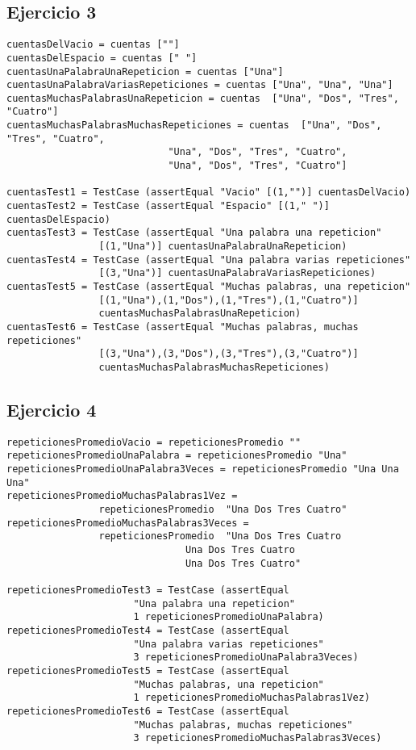 \documentclass[spanish, 10pt,a4paper]{article}
\numberwithin{equation}{section} %
\begin{document}
\subsection{Ejercicio 3}
\begin{lstlisting}
cuentasDelVacio = cuentas [""]
cuentasDelEspacio = cuentas [" "]
cuentasUnaPalabraUnaRepeticion = cuentas ["Una"]
cuentasUnaPalabraVariasRepeticiones = cuentas ["Una", "Una", "Una"]
cuentasMuchasPalabrasUnaRepeticion = cuentas  ["Una", "Dos", "Tres", "Cuatro"]
cuentasMuchasPalabrasMuchasRepeticiones = cuentas  ["Una", "Dos", "Tres", "Cuatro", 
						    "Una", "Dos", "Tres", "Cuatro",  
						    "Una", "Dos", "Tres", "Cuatro"]

cuentasTest1 = TestCase (assertEqual "Vacio" [(1,"")] cuentasDelVacio)
cuentasTest2 = TestCase (assertEqual "Espacio" [(1," ")] cuentasDelEspacio)
cuentasTest3 = TestCase (assertEqual "Una palabra una repeticion" 
				[(1,"Una")] cuentasUnaPalabraUnaRepeticion)
cuentasTest4 = TestCase (assertEqual "Una palabra varias repeticiones" 
				[(3,"Una")] cuentasUnaPalabraVariasRepeticiones)
cuentasTest5 = TestCase (assertEqual "Muchas palabras, una repeticion" 
				[(1,"Una"),(1,"Dos"),(1,"Tres"),(1,"Cuatro")] 
				cuentasMuchasPalabrasUnaRepeticion)
cuentasTest6 = TestCase (assertEqual "Muchas palabras, muchas repeticiones" 
				[(3,"Una"),(3,"Dos"),(3,"Tres"),(3,"Cuatro")] 
				cuentasMuchasPalabrasMuchasRepeticiones)

\end{lstlisting}

\subsection{Ejercicio 4}
\begin{lstlisting}
repeticionesPromedioVacio = repeticionesPromedio ""
repeticionesPromedioUnaPalabra = repeticionesPromedio "Una"
repeticionesPromedioUnaPalabra3Veces = repeticionesPromedio "Una Una Una"
repeticionesPromedioMuchasPalabras1Vez = 
				repeticionesPromedio  "Una Dos Tres Cuatro"
repeticionesPromedioMuchasPalabras3Veces = 
				repeticionesPromedio  "Una Dos Tres Cuatro 
						       Una Dos Tres Cuatro
						       Una Dos Tres Cuatro"

repeticionesPromedioTest3 = TestCase (assertEqual 
			   	      "Una palabra una repeticion"  
				      1 repeticionesPromedioUnaPalabra)
repeticionesPromedioTest4 = TestCase (assertEqual 
 				      "Una palabra varias repeticiones" 
				      3 repeticionesPromedioUnaPalabra3Veces)
repeticionesPromedioTest5 = TestCase (assertEqual 
			 	      "Muchas palabras, una repeticion" 
				      1 repeticionesPromedioMuchasPalabras1Vez)
repeticionesPromedioTest6 = TestCase (assertEqual 
				      "Muchas palabras, muchas repeticiones" 
				      3 repeticionesPromedioMuchasPalabras3Veces)

\end{lstlisting}
\end{document}
